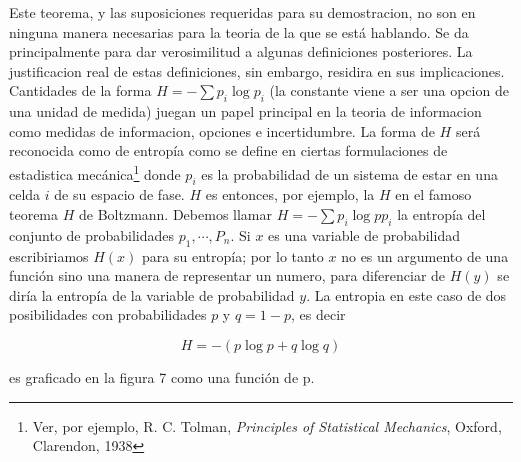 Este teorema, y las suposiciones requeridas para su demostracion,
no son en ninguna manera necesarias para la teoria de la
que se est\'{a} hablando.
Se da principalmente para dar verosimilitud a algunas
definiciones posteriores. La justificacion real de estas
definiciones, sin embargo, residira en sus implicaciones.
Cantidades de la forma $H = -\sum p_{i} \log p_{i}$ (la constante
viene a ser una opcion de una unidad de medida) juegan un papel
principal en la teoria de informacion como medidas de
informacion, opciones e incertidumbre. La forma de $H$ ser\'{a}
reconocida como de entrop\'{i}a como se define en ciertas formulaciones
de estadistica mec\'{a}nica\footnote{Ver, por ejemplo, R. C. Tolman, \textit{Principles of Statistical Mechanics}, Oxford, Clarendon, 1938}
donde $p_{i}$ es la probabilidad de un sistema de estar en
una celda $i$ de su espacio de fase. $H$ es entonces, por ejemplo,
la $H$ en el famoso teorema $H$ de Boltzmann. Debemos llamar
$H = -\sum p_{i} \log{p} p_{i}$ la entrop\'{i}a del conjunto de
probabilidades $p_{1}, \cdots,P_{n}$. Si $x$ es una variable
de probabilidad escribiriamos $H(x)$ para su entrop\'{i}a; por
lo tanto $x$ no es un argumento de una funci\'{o}n sino
una manera de representar un numero, para diferenciar de
$H(y)$ se dir\'{i}a la entrop\'{i}a de la variable de probabilidad $y$.
La entropia en este caso de dos posibilidades con probabilidades $p$
y $q = 1 - p$, es decir

\begin{equation}
H = -(p \log p + q \log q)
\end{equation}

es graficado en la figura 7 como una funci\'{o}n de p.


